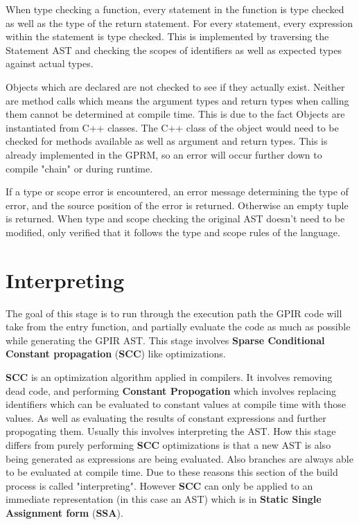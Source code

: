 When type checking a function, every statement in the function is type checked
as well as the type of the return statement. For every statement,
every expression within the statement is type checked. This is implemented by traversing
the Statement AST and checking the scopes of identifiers as well as expected types
against actual types.

Objects which are declared are not checked to see if they actually exist. Neither
are method calls which means the argument types and return types when calling them
cannot be determined at compile time. This is due to the fact Objects are instantiated from
C++ classes. The C++ class of the object would need to be checked for 
methods available as well as argument and return types. 
This is already implemented in the GPRM, so an error will occur further down to compile "chain" or during
runtime.

If a type or scope error is encountered, an error message determining the type of error,
and the source position of the error is returned. Otherwise an empty tuple is returned.
When type and scope checking the original AST doesn't need to be modified, only verified
that it follows the type and scope rules of the language.


\section{Interpreting}

The goal of this stage is to run through the execution path the GPIR code
will take from the entry function, and partially evaluate the code as much
as possible while generating the GPIR AST. This stage involves
\textbf{Sparse Conditional Constant propagation} (\textbf{SCC}) like optimizations.

\textbf{SCC}\cite{sccp} is an optimization algorithm applied in compilers. It involves removing
dead code, and performing \textbf{Constant Propogation} which involves replacing
identifiers which can be evaluated to constant values at compile time with
those values. As well as evaluating the results of constant expressions and
further propogating them. Usually this involves interpreting
the AST. How this stage differs from purely performing \textbf{SCC} optimizations
is that a new
AST is also being generated as expressions are being evaluated. Also branches 
are always able to be evaluated at compile time. Due to these reasons this
section of the build process is called "interpreting". However
\textbf{SCC} can only be applied to an immediate representation (in this case an AST)
which is in \textbf{Static Single Assignment form} (\textbf{SSA}). 

